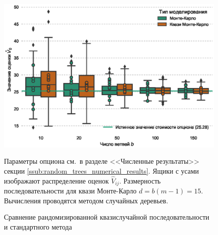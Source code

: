 \documentclass[specialist,
               substylefile = ../spbu.rtx,
               subf,href,colorlinks=true, 12pt]{disser}
\newcommand{\Vhat}{\hat{V}}
\begin{document}

\begin{figure}[h]
    \centering
	\includegraphics[width=\textwidth]{quasi_vs_common_mc.eps}
	\caption{Сравнение рандомизированной квазислучайной последовательности и стандартного метода}
	\footnotesize Параметры опциона см.~в разделе <<Численные результаты>> секции \ref{ssub:random_trees_numerical_results}. Ящики с усами изображают распределение оценок $\Vhat_{ij}$. Размерность последовательности для квази Монте-Карло $d = b(m-1) = 15$. Вычисления проводятся методом случайных деревьев.
	\label{fig:quasi_vs_common_mc}
\end{figure}
\end{document}
